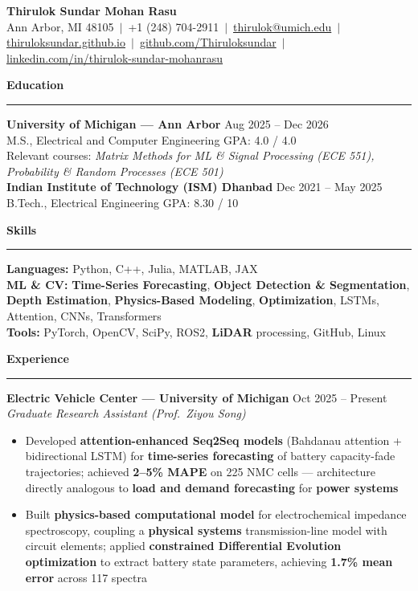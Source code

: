 \documentclass[9pt]{article}
\newcommand{\sect}[1]{\vspace{4pt}\noindent\textbf{\large #1}\vspace{3pt}\hrule\vspace{6pt}}
\begin{document}
\begin{center}
  {\Large \textbf{Thirulok Sundar Mohan Rasu}}\\[3pt]
  Ann Arbor, MI 48105 $\,|\,$ +1 (248) 704-2911 $\,|\,$
  \href{mailto:thirulok@umich.edu}{thirulok@umich.edu} $\,|\,$
  \href{https://thiruloksundar.github.io}{thiruloksundar.github.io} $\,|\,$
  \href{https://github.com/Thiruloksundar}{github.com/Thiruloksundar} $\,|\,$
  \href{https://www.linkedin.com/in/thirulok-sundar-mohanrasu/}{linkedin.com/in/thirulok-sundar-mohanrasu}
\end{center}
\vspace{-3mm}

\sect{Education}
\textbf{University of Michigan --- Ann Arbor} \hfill Aug 2025 -- Dec 2026\\
M.S., Electrical and Computer Engineering \hfill GPA: 4.0 / 4.0\\
Relevant courses: \emph{Matrix Methods for ML \& Signal Processing (ECE 551), Probability \& Random Processes (ECE 501)}\\[5pt]
\textbf{Indian Institute of Technology (ISM) Dhanbad} \hfill Dec 2021 -- May 2025\\
B.Tech., Electrical Engineering \hfill GPA: 8.30 / 10

\sect{Skills}
\textbf{Languages:} Python, C++, Julia, MATLAB, JAX\\
\textbf{ML \& CV:} \textbf{Time-Series Forecasting}, \textbf{Object Detection \& Segmentation}, \textbf{Depth Estimation}, \textbf{Physics-Based Modeling}, \textbf{Optimization}, LSTMs, Attention, CNNs, Transformers\\
\textbf{Tools:} PyTorch, OpenCV, SciPy, ROS2, \textbf{LiDAR} processing, GitHub, Linux

\sect{Experience}

\textbf{Electric Vehicle Center --- University of Michigan} \hfill Oct 2025 -- Present\\
\emph{Graduate Research Assistant (Prof.\ Ziyou Song)}
\vspace{-2mm}
\begin{itemize}[leftmargin=*,noitemsep,topsep=1pt]
  \item Developed \textbf{attention-enhanced Seq2Seq models} (Bahdanau attention + bidirectional LSTM) for \textbf{time-series forecasting} of battery capacity-fade trajectories; achieved \textbf{2--5\% MAPE} on 225 NMC cells --- architecture directly analogous to \textbf{load and demand forecasting} for \textbf{power systems}
  \item Built \textbf{physics-based computational model} for electrochemical impedance spectroscopy, coupling a \textbf{physical systems} transmission-line model with circuit elements; applied \textbf{constrained Differential Evolution optimization} to extract battery state parameters, achieving \textbf{1.7\% mean error} across 117 spectra
\end{itemize}
\end{document}
